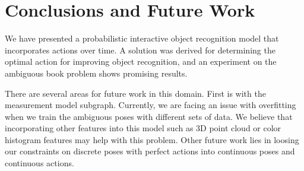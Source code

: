 \section{Conclusions and Future Work}

We have presented a probabilistic interactive object recognition model that incorporates actions over time.  A solution was derived for determining the optimal action for improving object recognition, and an experiment on the ambiguous book problem shows promising results.

    There are several areas for future work in this domain. First is with the measurement model subgraph. Currently, we are facing an issue with overfitting when we train the ambiguous poses with different sets of data. We believe that incorporating other features into this model such as 3D point cloud or color histogram features may help with this problem.
    Other future work lies in loosing our constraints on discrete poses with perfect actions into continuous poses and continuous actions. 

   